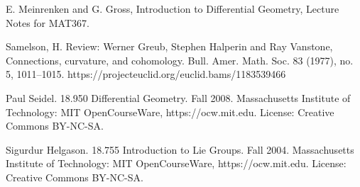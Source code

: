 \documentclass{article}
\theoremstyle{definition}
\begin{document}
\newpage
\begin{thebibliography}{}

\bibitem[]{}
E. Meinrenken and G. Gross, Introduction to Differential Geometry, Lecture Notes for MAT367. 

\bibitem[]{}
Samelson, H. Review: Werner Greub, Stephen Halperin and Ray Vanstone, Connections, curvature, and cohomology. Bull. Amer. Math. Soc. 83 (1977), no. 5, 1011--1015. https://projecteuclid.org/euclid.bams/1183539466

\bibitem[]{}
Paul Seidel. 18.950 Differential Geometry. Fall 2008. Massachusetts Institute of Technology: MIT OpenCourseWare, https://ocw.mit.edu. License: Creative Commons BY-NC-SA.

\bibitem[]{}
Sigurdur Helgason. 18.755 Introduction to Lie Groups. Fall 2004. Massachusetts Institute of Technology: MIT OpenCourseWare, https://ocw.mit.edu. License: Creative Commons BY-NC-SA.


\end{thebibliography}
\end{document}
